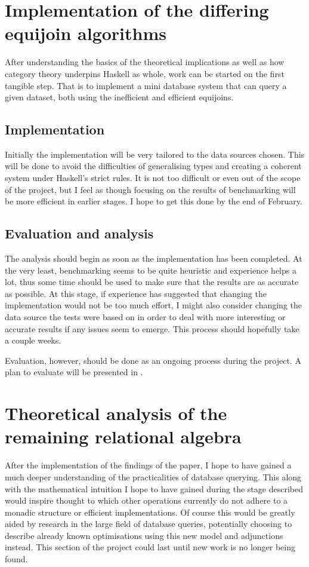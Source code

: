 \section{Implementation of the differing equijoin algorithms}\label{sec:implementation}
After understanding the basics of the theoretical implications as well as how category theory underpins Haskell as whole, work can be started on the first tangible step. That is to implement a mini database system that can query a given dataset, both using the inefficient and efficient equijoins.
\subsection{Implementation}
Initially the implementation will be very tailored to the data sources chosen. This will be done to avoid the difficulties of generalising types and creating a coherent system under Haskell's strict rules. It is not too difficult or even out of the scope of the project, but I feel as though focusing on the results of benchmarking will be more efficient in earlier stages. I hope to get this done by the end of February.
\subsection{Evaluation and analysis}
The analysis should begin as soon as the implementation has been completed. At the very least, benchmarking seems to be quite heuristic and experience helps a lot, thus some time should be used to make sure that the results are as accurate as possible. At this stage, if experience has suggested that changing the implementation would not be too much effort, I might also consider changing the data source the tests were based on in order to deal with more interesting or accurate results if any issues seem to emerge. This process should hopefully take a couple weeks.

Evaluation, however, should be done as an ongoing process during the project. A plan to evaluate will be presented in .

\section{Theoretical analysis of the remaining relational algebra}\label{sec:theoreticalanalysis}
After the implementation of the findings of the paper, I hope to have gained a much deeper understanding of the practicalities of database querying. This along with the mathematical intuition I hope to have gained during the stage described  would inspire thought to which other operations currently do not adhere to a monadic structure or efficient implementations. Of course this would be greatly aided by research in the large field of database queries, potentially choosing to describe already known optimisations using this new model and adjunctions instead. This section of the project could last until new work is no longer being found.
